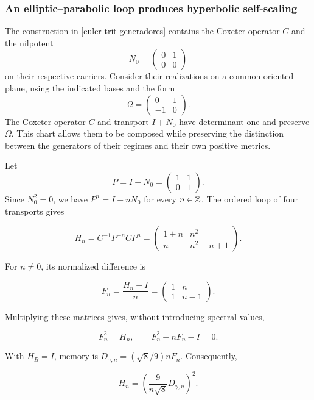 \subsubsection{An elliptic–parabolic loop produces hyperbolic self-scaling}

The construction in \cref{euler-trit-generadores} contains the Coxeter operator \(C\) and the nilpotent
\[
 N_0=\begin{pmatrix}0&1\\0&0\end{pmatrix}
\]
on their respective carriers. Consider their realizations on a common oriented plane, using the indicated bases and the form
\[
 \Omega=\begin{pmatrix}0&1\\-1&0\end{pmatrix}.
\]
The Coxeter operator \(C\) and transport \(I+N_0\) have determinant one and preserve \(\Omega\). This chart allows them to be composed while preserving the distinction between the generators of their regimes and their own positive metrics.

Let
\[
 P=I+N_0=\begin{pmatrix}1&1\\0&1\end{pmatrix}.
\]
Since \(N_0^2=0\), we have \(P^n=I+nN_0\) for every \(n\in\mathbb Z\). The ordered loop of four transports gives

\begin{equation}
H_n=C^{-1}P^{-n}CP^n
=\begin{pmatrix}1+n&n^2\\n&n^2-n+1\end{pmatrix}.
\label{nuc11:eq:28}
\end{equation}

For \(n\ne0\), its normalized difference is

\[
F_n=\frac{H_n-I}{n}
=\begin{pmatrix}1&n\\1&n-1\end{pmatrix}.
\]

Multiplying these matrices gives, without introducing spectral values,

\begin{equation}
\boxed{F_n^2=H_n,\qquad F_n^2-nF_n-I=0.}
\label{nuc11:eq:29}
\end{equation}

With \(H_B=I\), memory is \(D_{\gamma,n}=(\sqrt8/9)nF_n\). Consequently,

\begin{equation}
\boxed{H_n=\left(\frac9{n\sqrt8}D_{\gamma,n}\right)^2.}
\label{nuc11:eq:30}
\end{equation}

